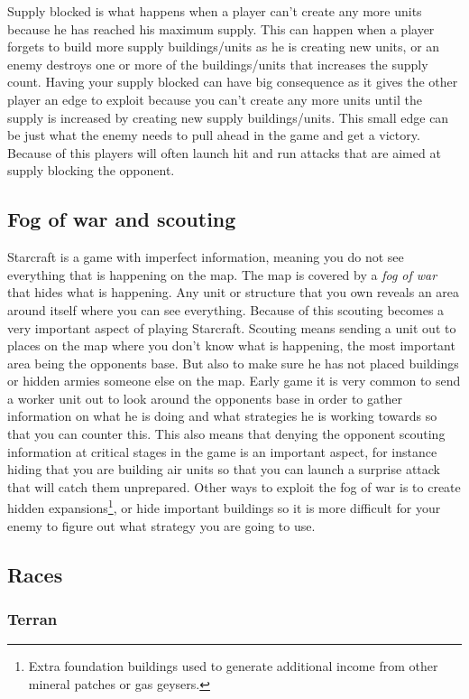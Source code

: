 Supply blocked is what happens when a player can't create any more units because
he has reached his maximum supply. This can happen when a player forgets to
build more supply buildings/units as he is creating new units, or an enemy
destroys one or more of the buildings/units that increases the supply count.
Having your supply blocked can have big consequence as it gives the other player
an edge to exploit because you can't create any more units until the supply is
increased by creating new supply buildings/units. This small edge can be just
what the enemy needs to pull ahead in the game and get a victory. Because of
this players will often launch hit and run attacks that are aimed at supply
blocking the opponent.
 
\subsection{Fog of war and scouting}
Starcraft is a game with imperfect information, meaning you do not see
everything that is happening on the map. The map is covered by a \textit{fog
of war} that hides what is happening. Any unit or structure that you own reveals
an area around itself where you can see everything. Because of this scouting
becomes a very important aspect of playing Starcraft. Scouting means sending a
unit out to places on the map where you don't know what is happening, the most
important area being the opponents base. But also to make sure he has not placed
buildings or hidden armies someone else on the map. Early game it is very common
to send a worker unit out to look around the opponents base in order to gather
information on what he is doing and what strategies he is working towards so
that you can counter this. This also means that denying the opponent scouting
information at critical stages in the game is an important aspect, for instance
hiding that you are building air units so that you can launch a surprise attack
that will catch them unprepared. Other ways to exploit the fog of war is to
create hidden expansions\footnote{Extra foundation buildings used to generate
additional income from other mineral patches or gas geysers.}, or hide important
buildings so it is more difficult for your enemy to figure out what strategy you
are going to use. 

\subsection{Races}

\subsubsection{Terran}


